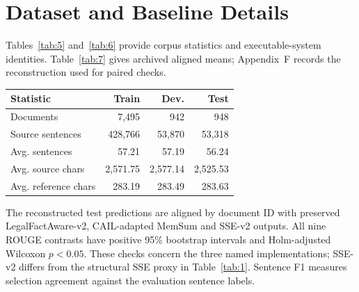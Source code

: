 \documentclass[10pt,twocolumn,letterpaper]{article}
\begin{document}
\par\medskip\noindent\begin{minipage}{\columnwidth}
\section{Dataset and Baseline Details}\label{appendix-c-dataset-and-baseline-details}

Tables~\ref{tab:5} and~\ref{tab:6} provide corpus statistics and executable-system identities. Table~\ref{tab:7} gives archived aligned means; Appendix~F records the reconstruction used for paired checks.

\label{tab:5}
\begin{tabular}{@{}lrrr@{}}
\toprule
\textbf{Statistic} & \textbf{Train} & \textbf{Dev.} & \textbf{Test} \\
\midrule
Documents & 7,495 & 942 & 948 \\
Source sentences & 428,766 & 53,870 & 53,318 \\
Avg. sentences & 57.21 & 57.19 & 56.24 \\
Avg. source chars & 2,571.75 & 2,577.14 & 2,525.53 \\
Avg. reference chars & 283.19 & 283.49 & 283.63 \\
\bottomrule
\end{tabular}
\end{minipage}\par\smallskip

The reconstructed test predictions are aligned by document ID with preserved LegalFactAware-v2, CAIL-adapted MemSum and SSE-v2 outputs. All nine ROUGE contrasts have positive 95\% bootstrap intervals and Holm-adjusted Wilcoxon $p<0.05$. These checks concern the three named implementations; SSE-v2 differs from the structural SSE proxy in Table~\ref{tab:1}. Sentence F1 measures selection agreement against the evaluation sentence labels.
\end{document}
